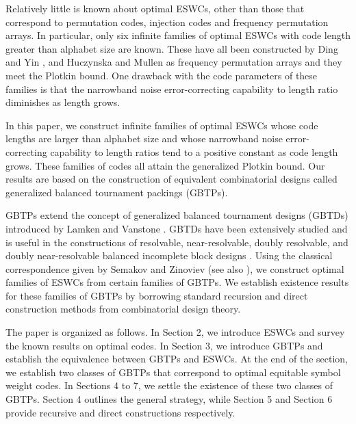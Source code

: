 \documentclass[draft, 11pt]{article}
\begin{document}
Relatively little is known about optimal ESWCs, %
other than those that correspond to
permutation codes, injection codes and frequency permutation arrays.
In particular, only six infinite families
of optimal ESWCs %
with code length greater than alphabet size are known.
These have all been constructed by
Ding and Yin \cite{DingYin:2006}, and Huczynska and Mullen \cite{Huczynska:2010}
as frequency permutation arrays and they meet
the Plotkin bound.
One drawback with the code parameters of these families
is that the narrowband noise error-correcting capability to length ratio 
diminishes as length grows.

In this paper, we construct infinite families of optimal ESWCs
 whose code lengths are larger than alphabet size and
whose narrowband noise 
error-correcting capability to length ratios tend to a positive constant as code length grows. These
families of codes all attain the generalized Plotkin bound. 
Our results are based on the construction of equivalent combinatorial designs called
generalized balanced tournament packings (GBTPs).

GBTPs extend the concept of generalized balanced tournament designs (GBTDs)
introduced by Lamken and Vanstone \cite{LamkenVanstone:1989}.
GBTDs have been extensively studied \cite{Lamken:1990,Lamken:1992,Lamken:1994,Yinetal:2008,Cheeetal:2013b,Daietal:2013}
and is useful in the constructions of  resolvable, near-resolvable, doubly resolvable, and 
doubly near-resolvable balanced incomplete block designs \cite{Lamken:1990,Lamken:1995,Lamken:1997}.
Using the classical correspondence given by Semakov and Zinoviev\cite{SemakovZinoviev:1968}
(see also \cite{DingYin:2005b, Bogdanovaetal:2007,Yinetal:2008}),
we construct optimal families of ESWCs from certain families of GBTPs.
We establish existence results for these families of GBTPs
by borrowing standard recursion and 
direct construction methods from combinatorial design theory.


The paper is organized as follows. 
In Section 2, we introduce ESWCs and
survey the known results on optimal codes. 
In Section 3, we introduce GBTPs and establish the equivalence 
between GBTPs and ESWCs. %
At the end of the section, we establish two classes of GBTPs that 
correspond to optimal equitable symbol weight codes. 
In Sections 4 to 7, we settle the existence of these two classes of GBTPs.
Section 4 outlines the general strategy, while 
Section 5 and Section 6 provide recursive and direct constructions respectively.
\end{document}
